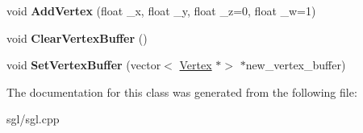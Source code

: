 \begin{DoxyCompactItemize}
void {\bfseries Add\+Vertex} (float \+\_\+x, float \+\_\+y, float \+\_\+z=0, float \+\_\+w=1)
\item 
\mbox{\label{class_image_structure_a27a8722b57e2c71ee56bea1c357c4624}} 
void {\bfseries Clear\+Vertex\+Buffer} ()
\item 
\mbox{\label{class_image_structure_a7a7359ab536e90c200ecac88802b15b5}} 
void {\bfseries Set\+Vertex\+Buffer} (vector$<$ \hyperlink{class_vertex}{Vertex} $\ast$$>$ $\ast$new\+\_\+vertex\+\_\+buffer)
\end{DoxyCompactItemize}


The documentation for this class was generated from the following file\+:\begin{DoxyCompactItemize}
\item 
sgl/sgl.\+cpp\end{DoxyCompactItemize}
